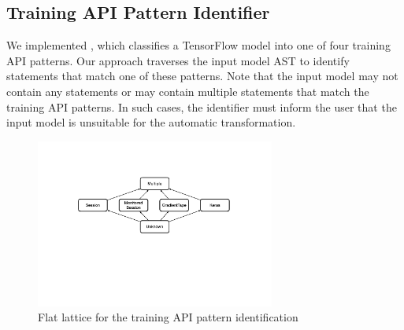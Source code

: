 
\subsection{Training API Pattern Identifier}\label{sec:ident}
We implemented \tapi, which classifies a TensorFlow model into one of four
training API patterns. 
Our approach traverses the input model AST to identify statements that match
one of these patterns. 
Note that the input model may not contain any statements or may contain
multiple statements that match the training API patterns. 
In such cases, the identifier must inform the user that the input model is
unsuitable for the automatic transformation.

\begin{figure}[ht!]
  \centering
  \includegraphics[width=0.7\textwidth]{lattice.pdf}
  \caption{Flat lattice for the training API pattern identification}
  \label{fig:pattern:lattice}
\end{figure}

